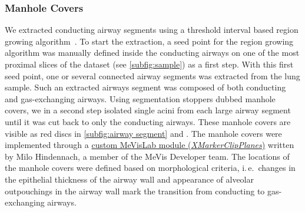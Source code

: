 \documentclass[%
	draft,
	paper=a4,%
	abstract=true,%
	]{scrartcl}
\newcommand{\ie}{i.\,e.\ }
\begin{document}
\subsubsection{Manhole Covers}
We extracted conducting airway segments using a threshold interval based region growing algorithm~\cite{Zucker1976}. To start the extraction, a seed point for the region growing algorithm was manually defined inside the conducting airways on one of the most proximal slices of the dataset (see \autoref{subfig:sample}) as a first step. With this first seed point, one or several connected airway segments was extracted from the lung sample. Such an extracted airways segment was composed of both conducting and gas-exchanging airways. Using segmentation stoppers dubbed manhole covers, we in a second step isolated single acini from each large airway segment until it was cut back to only the conducting airways. These manhole covers are visible as red discs in \autoref{subfig:airway segment} and . The manhole covers were implemented through a \href{http://www.mevis-research.de/cgi-bin/discus/board-auth.cgi?lm=1282233250&file=/839/11760.html}{custom MeVisLab module (\emph{XMarkerClipPlanes})} written by Milo Hindennach, a member of the MeVis Developer team. The locations of the manhole covers were defined based on morphological criteria, \ie changes in the epithelial thickness of the airway wall and appearance of alveolar outpouchings in the airway wall mark the transition from conducting to gas-exchanging airways.
\end{document}
